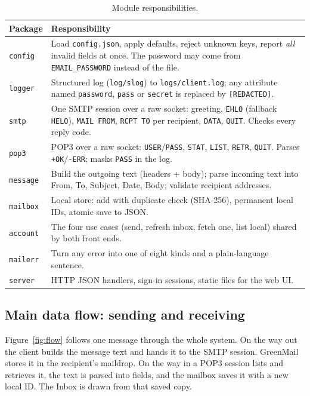 \documentclass[11pt,a4paper]{article}
\begin{document}
\begin{table}[H]
\centering\small
\caption{Module responsibilities.}
\begin{tabularx}{\linewidth}{@{} l X @{}}
\toprule
\textbf{Package} & \textbf{Responsibility} \\
\midrule
\texttt{config}  & Load \texttt{config.json}, apply defaults, reject unknown keys, report \emph{all} invalid fields at once. The password may come from \texttt{EMAIL\_PASSWORD} instead of the file. \\
\texttt{logger}  & Structured log (\texttt{log/slog}) to \texttt{logs/client.log}; any attribute named \texttt{password}, \texttt{pass} or \texttt{secret} is replaced by \texttt{[REDACTED]}. \\
\texttt{smtp}    & One SMTP session over a raw socket: greeting, \texttt{EHLO} (fallback \texttt{HELO}), \texttt{MAIL FROM}, \texttt{RCPT TO} per recipient, \texttt{DATA}, \texttt{QUIT}. Checks every reply code. \\
\texttt{pop3}    & POP3 over a raw socket: \texttt{USER}/\texttt{PASS}, \texttt{STAT}, \texttt{LIST}, \texttt{RETR}, \texttt{QUIT}. Parses \texttt{+OK}/\texttt{-ERR}; masks \texttt{PASS} in the log. \\
\texttt{message} & Build the outgoing text (headers + body); parse incoming text into From, To, Subject, Date, Body; validate recipient addresses. \\
\texttt{mailbox} & Local store: add with duplicate check (SHA-256), permanent local IDs, atomic save to JSON. \\
\texttt{account} & The four use cases (send, refresh inbox, fetch one, list local) shared by both front ends. \\
\texttt{mailerr} & Turn any error into one of eight kinds and a plain-language sentence. \\
\texttt{server}  & HTTP JSON handlers, sign-in sessions, static files for the web UI. \\
\bottomrule
\end{tabularx}
\end{table}

\subsection{Main data flow: sending and receiving}

Figure~\ref{fig:flow} follows one message through the whole system. On the way out the
client builds the message text and hands it to the SMTP session. GreenMail stores it in the
recipient's maildrop. On the way in a POP3 session lists and retrieves it, the text is parsed
into fields, and the mailbox saves it with a new local ID. The Inbox is drawn from that saved
copy.
\end{document}
